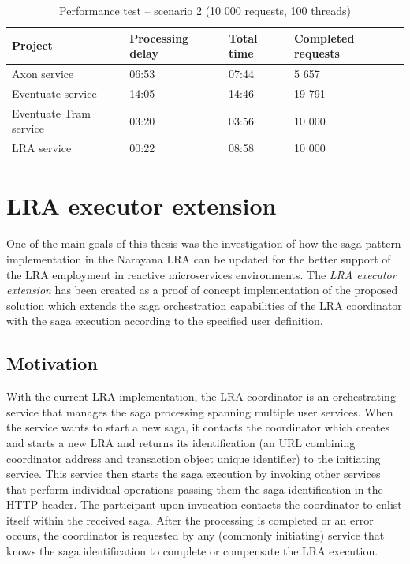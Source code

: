\documentclass[oneside,
  digital, %
  table,   %
  lof,     %
  lot,     %
]{fithesis3}
\begin{document}
\begin{table}[h]
    \begin{tabularx}{\textwidth}{lXXX}
        \toprule
        Project & Processing delay & Total time & Completed requests \\
        \midrule
        Axon service & 06:53 & 07:44 & 5 657 \\
        Eventuate service & 14:05 & 14:46 & 19 791 \\
        Eventuate Tram service & 03:20 & 03:56 & 10 000 \\
        LRA service & 00:22 & 08:58 & 10 000 \\
        \bottomrule
    \end{tabularx}
    \caption{Performance test -- scenario 2 (10 000 requests, 100 threads)}
    \label{tab:performance-scenario-2}
\end{table}

\clearpage
\chapter{LRA executor extension}

One of the main goals of this thesis was the investigation of how the saga pattern implementation in the Narayana LRA can be updated for the better support of the LRA employment in reactive microservices environments. The \textit{LRA executor extension} has been created as a proof of concept implementation of the proposed solution which extends the saga orchestration capabilities of the LRA coordinator with the saga execution according to the specified user definition.

\section{Motivation}

With the current LRA implementation, the LRA coordinator is an orchestrating service that manages the saga processing spanning multiple user services. When the service wants to start a new saga, it contacts the coordinator which creates and starts a new LRA and returns its identification (an URL combining coordinator address and transaction object unique identifier) to the initiating service. This service then starts the saga execution by invoking other services that perform individual operations passing them the saga identification in the HTTP header. The participant upon invocation contacts the coordinator to enlist itself within the received saga. After the processing is completed or an error occurs, the coordinator is requested by any (commonly initiating) service that knows the saga identification to complete or compensate the LRA execution.
\end{document}
